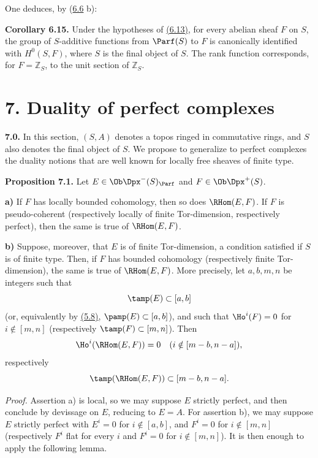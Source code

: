 One deduces, by (\hyperlink{sga6.e01.rem.6-6}{6.6} b):

\textbf{Corollary 6.15.} Under the hypotheses of \hyperlink{sga6.e01.para.6-13}{(6.13)}, for every abelian sheaf \(F\) on \(S\), the group of \(S\)-additive functions from \(\Parf(S)\) to \(F\) is canonically identified with \(H^0(S,F)\), where \(S\) is the final object of \(S\). The rank function corresponds, for \(F=\mathbb Z_S\), to the unit section of \(\mathbb Z_S\).

\section*{7. Duality of perfect complexes}

\textbf{7.0.} In this section, \((S,A)\) denotes a topos ringed in commutative rings, and \(S\) also denotes the final object of \(S\). We propose to generalize to perfect complexes the duality notions that are well known for locally free sheaves of finite type.

\textbf{Proposition 7.1.} Let \(E\in\Ob\Dpx^-(S)_{\Parf}\) and \(F\in\Ob\Dpx^+(S)\).

\textbf{a)} If \(F\) has locally bounded cohomology, then so does \(\RHom(E,F)\). If \(F\) is pseudo-coherent (respectively locally of finite Tor-dimension, respectively perfect), then the same is true of \(\RHom(E,F)\).

\textbf{b)} Suppose, moreover, that \(E\) is of finite Tor-dimension, a condition satisfied if \(S\) is of finite type. Then, if \(F\) has bounded cohomology (respectively finite Tor-dimension), the same is true of \(\RHom(E,F)\). More precisely, let \(a,b,m,n\) be integers such that
\[
  \tamp(E)\subset[a,b]
\]
(or, equivalently by \hyperlink{sga6.e01.thm.5-8}{(5.8)}, \(\pamp(E)\subset[a,b]\)), and such that \(\Ho^i(F)=0\) for \(i\notin[m,n]\) (respectively \(\tamp(F)\subset[m,n]\)). Then
\[
  \Ho^i(\RHom(E,F))=0\quad(i\notin[m-b,n-a]),
\]
respectively
\[
  \tamp(\RHom(E,F))\subset[m-b,n-a].
\]

\emph{Proof.} Assertion a) is local, so we may suppose \(E\) strictly perfect, and then conclude by devissage on \(E\), reducing to \(E=A\). For assertion b), we may suppose \(E\) strictly perfect with \(E^i=0\) for \(i\notin[a,b]\), and \(F^i=0\) for \(i\notin[m,n]\) (respectively \(F^i\) flat for every \(i\) and \(F^i=0\) for \(i\notin[m,n]\)). It is then enough to apply the following lemma.

